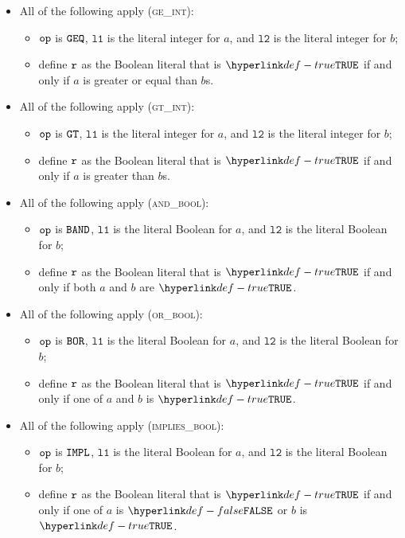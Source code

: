 \documentclass{book}
\newcommand\vlone[0]{\texttt{l1}}
\newcommand\vltwo[0]{\texttt{l2}}
\begin{document}
\begin{itemize}
  \item All of the following apply (\textsc{ge\_int}):
  \begin{itemize}
    \item $\texttt{op}$ is $\texttt{GEQ}$, $\vlone$ is the literal integer for $a$, and $\vltwo$ is the literal integer for $b$;
    \item define $\texttt{r}$ as the Boolean literal that is $\True$ if and only if $a$ is greater or equal than $b$s.
  \end{itemize}

  \item All of the following apply (\textsc{gt\_int}):
  \begin{itemize}
    \item $\texttt{op}$ is $\texttt{GT}$, $\vlone$ is the literal integer for $a$, and $\vltwo$ is the literal integer for $b$;
    \item define $\texttt{r}$ as the Boolean literal that is $\True$ if and only if $a$ is greater than $b$s.
  \end{itemize}

  \item All of the following apply (\textsc{and\_bool}):
  \begin{itemize}
    \item $\texttt{op}$ is $\texttt{BAND}$, $\vlone$ is the literal Boolean for $a$, and $\vltwo$ is the literal Boolean for $b$;
    \item define $\texttt{r}$ as the Boolean literal that is $\True$ if and only if both $a$ and $b$ are $\True$.
  \end{itemize}

  \item All of the following apply (\textsc{or\_bool}):
  \begin{itemize}
    \item $\texttt{op}$ is $\texttt{BOR}$, $\vlone$ is the literal Boolean for $a$, and $\vltwo$ is the literal Boolean for $b$;
    \item define $\texttt{r}$ as the Boolean literal that is $\True$ if and only if one of $a$ and $b$ is $\True$.
  \end{itemize}

  \item All of the following apply (\textsc{implies\_bool}):
  \begin{itemize}
    \item $\texttt{op}$ is $\texttt{IMPL}$, $\vlone$ is the literal Boolean for $a$, and $\vltwo$ is the literal Boolean for $b$;
    \item define $\texttt{r}$ as the Boolean literal that is $\True$ if and only if one of $a$ is $\False$ or $b$ is $\True$.
  \end{itemize}


\end{itemize}
\end{document}
